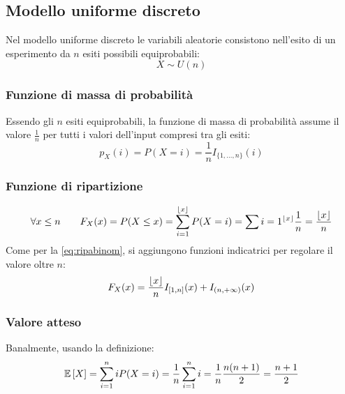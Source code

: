 \subsection{Modello uniforme discreto}
Nel modello uniforme discreto le variabili aleatorie consistono nell'esito di un esperimento da $n$ esiti possibili equiprobabili:
\begin{equation*}
	X\sim U(n)
\end{equation*}


\subsubsection{Funzione di massa di probabilità}
Essendo gli $n$ esiti equiprobabili, la funzione di massa di probabilità assume il valore $\frac{1}{n}$ per tutti i valori dell'input compresi tra gli esiti:
\begin{equation*}
	p_X(i) = P(X=i) = \frac{1}{n} I_{\{1,\dots,n\}}(i)
\end{equation*}


\subsubsection{Funzione di ripartizione}
\begin{equation*}
	\forall x\leq n\qquad F_X(x) = P(X\leq x) = \sum_{i=1}^{\left\lfloor x \right\rfloor} P(X=i) = \sum{i=1}^{\left\lfloor x \right\rfloor} \frac{1}{n} = \frac{\left\lfloor x \right\rfloor}{n}
\end{equation*}
Come per la \eqref{eq:ripabinom}, si aggiungono funzioni indicatrici per regolare il valore oltre $n$:
\begin{equation}
	F_X(x)=\frac{\left\lfloor x \right\rfloor}{n} I_{[1,n]}(x)+I_{(n,+\infty)}(x)
\end{equation}


\subsubsection{Valore atteso}
Banalmente, usando la definizione:
\begin{equation} \label{eq:disunvalat}
	\mathbb{E}\left[ X \right] = \sum_{i=1}^n i P(X=i) = \frac{1}{n} \sum_{i=1}^n i = \frac{1}{n}\frac{n(n+1)}{2} = \frac{n+1}{2}
\end{equation}


